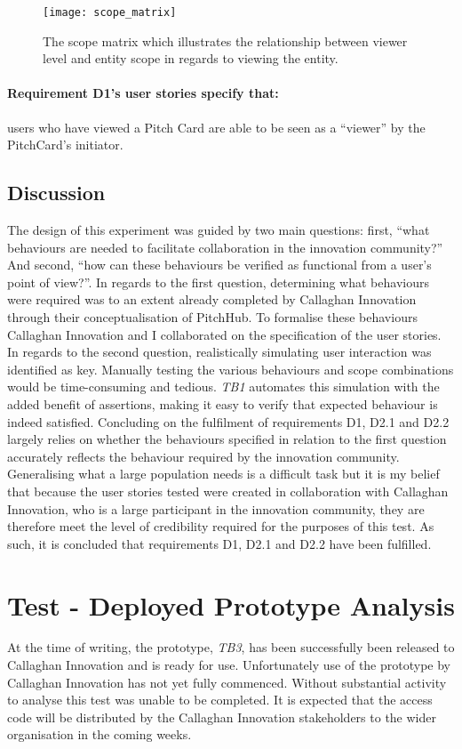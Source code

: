 \begin{figure}[ht]
    \centering
    \texttt{[image: scope\_matrix]}
    \caption{The scope matrix which illustrates the relationship between viewer level and entity scope in regards to viewing the entity.}
    \label{fig:architecturescope_matrix_evaluation}
\end{figure}

\paragraph{Requirement D1's user stories specify that:} users who have viewed a Pitch Card are able to be seen as a ``viewer'' by the PitchCard's initiator.

\subsection{Discussion}
The design of this experiment was guided by two main questions: first, ``what behaviours are needed to facilitate collaboration in the innovation community?'' And second, ``how can these behaviours be verified as functional from a user's point of view?''. In regards to the first question, determining what behaviours were required was to an extent already completed by Callaghan Innovation through their conceptualisation of PitchHub. To formalise these behaviours Callaghan Innovation and I collaborated on the specification of the user stories.
In regards to the second question, realistically simulating user interaction was identified as key. Manually testing the various behaviours and scope combinations would be time-consuming and tedious. \textit{TB1} automates this simulation with the added benefit of assertions, making it easy to verify that expected behaviour is indeed satisfied.
Concluding on the fulfilment of requirements D1, D2.1 and D2.2 largely relies on whether the behaviours specified in relation to the first question accurately reflects the behaviour required by the innovation community. Generalising what a large population needs is a difficult task but it is my belief that because the user stories tested were created in collaboration with Callaghan Innovation, who is a large participant in the innovation community, they are therefore meet the level of credibility required for the purposes of this test. As such, it is concluded that requirements D1, D2.1 and D2.2 have been fulfilled.

\section{Test  - Deployed Prototype Analysis}\label{S:test_2}
At the time of writing, the prototype, \textit{TB3}, has been successfully been released to Callaghan Innovation and is ready for use. Unfortunately use of the prototype by Callaghan Innovation has not yet fully commenced. Without substantial activity to analyse this test was unable to be completed. It is expected that the access code will be distributed by the Callaghan Innovation stakeholders to the wider organisation in the coming weeks.

